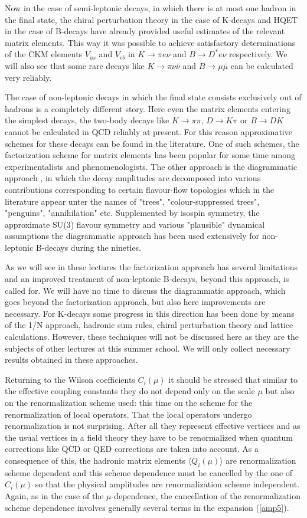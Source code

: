 \documentclass[12pt]{article}
\begin{document}
Now in the case of semi-leptonic decays, in which there is at most one hadron
in the final state, the chiral perturbation theory in the case of K-decays
and HQET in the case of B-decays have already provided useful estimates of
the relevant matrix elements. This way it was possible to achieve
satisfactory determinations of the CKM elements $V_{us}$ and $V_{cb}$ in 
$K\to\pi e\nu$ and $B\to D^*e\nu$ respectively. 
We will also see that some rare decays like $K\to\pi\nu\bar\nu$ and
$B\to\mu\bar\mu$ can be calculated very reliably.

The case of non-leptonic decays in which the final state consists exclusively
out of hadrons is a completely different story. Here even the matrix
elements entering the simplest decays, the two-body decays like 
$K\to\pi\pi$, $D\to K\pi$ or $B\to DK$ cannot be
calculated in QCD reliably at present. For this reason approximative schemes
for these decays can be found in the literature. One of such schemes, the
factorization scheme for matrix elements has been popular for some time among
experimentalists and phenomenologists. The other approach is the diagrammatic
approach \cite{DIAG}, 
in which the decay amplitudes are decomposed into various
contributions corresponding to certain flavour-flow topologies which in the
literature appear unter the names of "trees", "colour-suppressed trees",
"penguins", "annihilation" etc. Supplemented by isospin symmetry, the
approximate SU(3) flavour symmetry and various "plausible" dynamical
assumptions the diagrammatic approach has been used extensively for
non-leptonic B-decays during the nineties.

As we will see in these lectures the factorization approach 
has several limitations and an improved treatment of
non-leptonic B-decays, beyond this approach, is called for. 
We will have no time to discuss the diagrammatic approach, which goes
beyond the factorization approach, but also here improvements
are necessary.
For K-decays
some progress in this direction has been done by means of the 1/N approach,
hadronic sum rules, chiral perturbation theory and lattice calculations.
However, these techniques will not be discussed here as they are the 
subjects of other lectures at this
summer school. We will only collect necessary results obtained in
these approaches.   

Returning to the Wilson coefficients $C_i(\mu)$ it should be stressed that 
similar
to the effective coupling constants they do not depend only on the scale $\mu$
but also on the renormalization scheme used: this time on the 
scheme for the renormalization of local operators. That the local operators 
undergo renormalization is not surprising. After all they represent effective
vertices and as the usual vertices in a field theory they have to be
renormalized when quantum corrections like QCD or QED corrections are taken
into account. As a consequence of this, the hadronic matrix elements 
$\langle Q_i(\mu)\rangle$
are
renormalization scheme dependent and this scheme dependence must be cancelled
by the one of $C_i(\mu)$ so that the physical amplitudes are 
renormalization scheme
independent. Again, as in the case of the $\mu$-dependence, the 
cancellation of
the renormalization scheme dependence involves generally several 
terms in the
expansion (\ref{amp5}).
\end{document}
